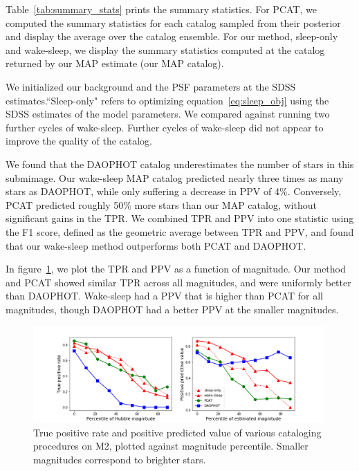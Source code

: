 Table~\ref{tab:summary_stats} prints the summary statistics. For PCAT, we 
computed the summary statistics for each catalog sampled from their posterior and display the average over the catalog ensemble. For our method, sleep-only and wake-sleep, we display the 
summary statistics computed at the catalog returned by our MAP estimate (our MAP catalog). 

We initialized our background and the PSF parameters at the SDSS estimates.``Sleep-only" refers 
to optimizing equation~\eqref{eq:sleep_obj} using the SDSS estimates of the model parameters. We compared against running two further cycles of wake-sleep. Further cycles of wake-sleep did not appear to improve the quality of the catalog. 

We found that the DAOPHOT catalog underestimates the number of stars in this submimage.
Our wake-sleep MAP catalog predicted nearly three times as many stars as DAOPHOT, while only suffering a decrease in PPV of 4\%. 
Conversely, PCAT predicted roughly 50\% more stars than our MAP catalog, without significant gains in the TPR. 
We combined TPR and PPV into one statistic using the F1 score,
defined as the geometric average between TPR and PPV, and found that our wake-sleep method outperforms both PCAT and DAOPHOT.



In figure~\ref{fig:summary_stats}, we plot the TPR and PPV as a function of magnitude.
Our method and PCAT showed similar TPR across all magnitudes, and were
uniformly better than DAOPHOT. Wake-sleep had a PPV that is higher than PCAT for all magnitudes, though DAOPHOT had a better PPV at the smaller magnitudes.

\begin{figure}[h]
    \centering
    \includegraphics[width=0.99\textwidth]{figures/summary_statistics_m2.png}
    \caption{True positive rate and positive predicted value of various cataloging
    procedures on M2, plotted against magnitude percentile.
    Smaller magnitudes correspond to brighter stars. }
    \label{fig:summary_stats}
\end{figure}

